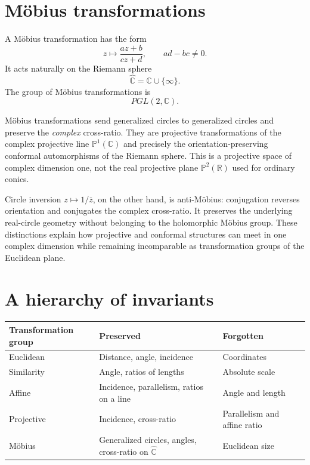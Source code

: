 \section{Möbius transformations}

A Möbius transformation has the form
\[
  z\mapsto \frac{az+b}{cz+d},\qquad ad-bc\neq0.
\]
It acts naturally on the Riemann sphere
\[
  \widehat{\mathbb C}=\mathbb C\cup\{\infty\}.
\]
The group of Möbius transformations is
\[
  PGL(2,\mathbb C).
\]

Möbius transformations send generalized circles to generalized circles and preserve the \emph{complex} cross-ratio. They are projective transformations of the complex projective line $\mathbb P^1(\mathbb C)$ and precisely the orientation-preserving conformal automorphisms of the Riemann sphere. This is a projective space of complex dimension one, not the real projective plane $\mathbb P^2(\mathbb R)$ used for ordinary conics.

Circle inversion $z\mapsto1/\overline z$, on the other hand, is anti-Möbius: conjugation reverses orientation and conjugates the complex cross-ratio. It preserves the underlying real-circle geometry without belonging to the holomorphic Möbius group. These distinctions explain how projective and conformal structures can meet in one complex dimension while remaining incomparable as transformation groups of the Euclidean plane.

\section{A hierarchy of invariants}

\begin{center}
\small
\begin{tabularx}{\textwidth}{@{}lYY@{}}
\toprule
Transformation group & Preserved & Forgotten\\
\midrule
Euclidean & Distance, angle, incidence & Coordinates\\
Similarity & Angle, ratios of lengths & Absolute scale\\
Affine & Incidence, parallelism, ratios on a line & Angle and length\\
Projective & Incidence, cross-ratio & Parallelism and affine ratio\\
Möbius & Generalized circles, angles, cross-ratio on \(\widehat{\mathbb C}\) & Euclidean size\\
\bottomrule
\end{tabularx}
\end{center}


